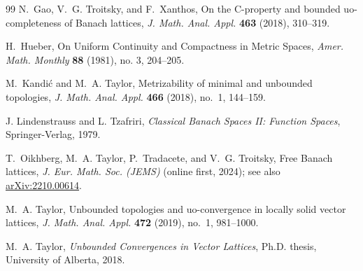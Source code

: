 \documentclass[11pt]{amsart}
\theoremstyle{definition}
\begin{document}
\begin{thebibliography}{99}
N.~Gao, V.~G. Troitsky, and F.~Xanthos,
\newblock On the C-property and bounded uo-completeness of Banach lattices,
\newblock \emph{J. Math. Anal. Appl.} \textbf{463} (2018), 310--319.

 H.~Hueber,
\newblock On Uniform Continuity and Compactness in Metric Spaces, 
\newblock \emph{Amer. Math. Monthly} \textbf{88} (1981), no. 3, 204--205.

M.~Kandi\'c and M.~A. Taylor,
\newblock Metrizability of minimal and unbounded topologies,
\newblock \emph{J. Math. Anal. Appl.} \textbf{466} (2018), no.~1, 144--159.

J. Lindenstrauss and L. Tzafriri,
\newblock \emph{Classical Banach Spaces II: Function Spaces},
\newblock Springer-Verlag, 1979.


T.~Oikhberg, M.~A. Taylor, P.~Tradacete, and V.~G. Troitsky,
\newblock Free Banach lattices,
\newblock \emph{J. Eur. Math. Soc. (JEMS)} (online first, 2024); see also \href{https://arxiv.org/abs/2210.00614}{arXiv:2210.00614}.

M.~A. Taylor,
\newblock Unbounded topologies and uo-convergence in locally solid vector lattices,
\newblock \emph{J. Math. Anal. Appl.} \textbf{472} (2019), no.~1, 981--1000.

M.~A. Taylor,
\newblock \emph{Unbounded Convergences in Vector Lattices},
\newblock Ph.D. thesis, University of Alberta, 2018.


\end{thebibliography}
\end{document}
